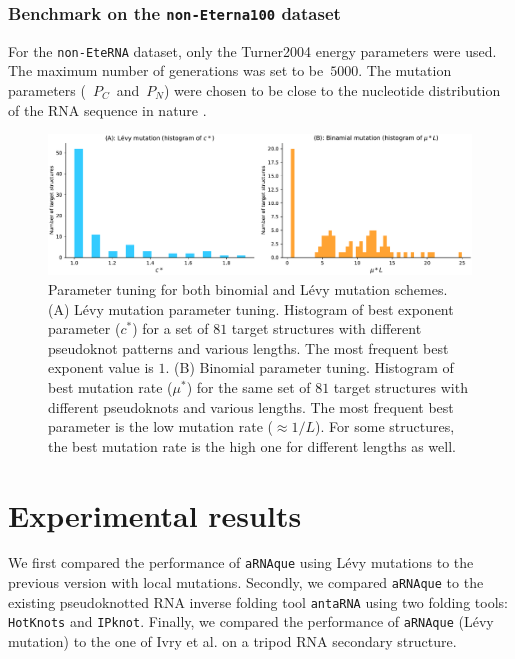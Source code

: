 \subsubsection*{Benchmark on the \texttt{non-Eterna100} dataset}
For the \texttt{non-EteRNA} dataset,  only the Turner2004 energy parameters were used. The maximum number of generations was set to be~\(5000\). The mutation parameters (~\(P_C\)~and~\(P_N\)) were chosen to be close to the nucleotide distribution of the RNA sequence in nature \cite{esmaili2015erd}.  

\begin{figure}[t!]
	\includegraphics[width=1.0 \linewidth]{../res/images/arnaque/fig3.pdf}
	\caption{Parameter tuning for both binomial and Lévy mutation schemes. (A) Lévy mutation parameter tuning. Histogram of best exponent parameter ($c^*$) for a set of $81$ target structures with different pseudoknot patterns and various lengths. The most frequent best exponent value is $1$. (B) Binomial parameter tuning. Histogram of best mutation rate ($\mu^*$) for the same set of $81$ target structures with different pseudoknots and various lengths. The most frequent best parameter is the low mutation rate ($\approx 1/L$). For some structures, the best mutation rate is the high one for different lengths as well.} \label{Fig:tunning}
\end{figure}
\section{Experimental results}
We first compared the performance of \texttt{aRNAque} using Lévy mutations to the previous version with local mutations. Secondly, we compared \texttt{aRNAque} to the existing pseudoknotted RNA inverse folding tool \texttt{antaRNA} using two folding tools: \texttt{HotKnots} and \texttt{IPknot}. Finally, we compared the performance of \texttt{aRNAque} (Lévy mutation) to the one of Ivry et al. on a tripod RNA secondary structure.

